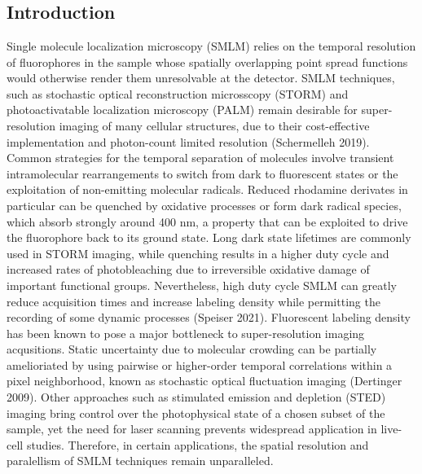 \documentclass{ucetd}
\begin{document}
\clearpage

\mainmatter

\chapter{}

\section{Introduction}

Single molecule localization microscopy (SMLM) relies on the temporal resolution of fluorophores in the sample whose spatially overlapping point spread functions would otherwise render them unresolvable at the detector. SMLM techniques, such as stochastic optical reconstruction microsscopy (STORM) and photoactivatable localization microscopy (PALM) remain desirable for super-resolution imaging of many cellular structures, due to their cost-effective implementation and photon-count limited resolution (Schermelleh 2019). Common strategies for the temporal separation of molecules involve transient intramolecular rearrangements to switch from dark to fluorescent states or the exploitation of non-emitting molecular radicals. Reduced rhodamine derivates in particular can be quenched by oxidative processes or form dark radical species, which absorb strongly around 400 nm, a property that can be exploited to drive the fluorophore back to its ground state. Long dark state lifetimes are commonly used in STORM imaging, while quenching results in a higher duty cycle and increased rates of photobleaching due to irreversible oxidative damage of important functional groups. Nevertheless, high duty cycle SMLM can greatly reduce acquisition times and increase labeling density while permitting the recording of some dynamic processes (Speiser 2021). Fluorescent labeling density has been known to pose a major bottleneck to super-resolution imaging acqusitions. Static uncertainty due to molecular crowding can be partially amelioriated by using pairwise or higher-order temporal correlations within a pixel neighborhood, known as stochastic optical fluctuation imaging (Dertinger 2009). Other approaches such as stimulated emission and depletion (STED) imaging bring control over the photophysical state of a chosen subset of the sample, yet the need for laser scanning prevents widespread application in live-cell studies. Therefore, in certain applications, the spatial resolution and paralellism of SMLM techniques remain unparalleled.
\end{document}
